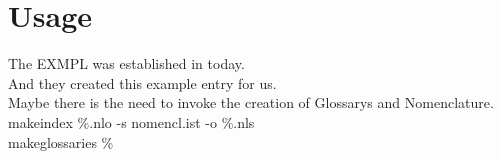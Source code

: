 \documentclass{article}
\begin{document}
\section{Usage}

The \gls{EXMPL} was established in today.\\
And they created this \gls{example} entry for us. \\

Maybe there is the need to invoke the creation of Glossarys and Nomenclature. \\
makeindex \%.nlo -s nomencl.ist -o \%.nls \\
makeglossaries \%


\newpage
{}
\printglossary[type=\acronymtype]

\printglossary


\printnomenclature
\end{document}
